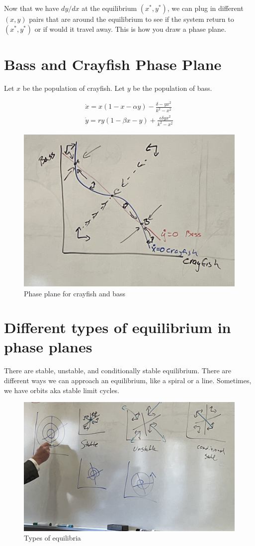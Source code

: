 \documentclass{article}
\begin{document}
Now that we have $dy/dx$ at the equilibrium $(x^*, y^*)$, we can plug in different $(x,y)$ pairs that are around the equilibrium to see if the system return to $(x^*, y^*)$ or if would it travel away. This is how you draw a phase plane. 


\section{Bass and Crayfish Phase Plane}

Let $x$ be the population of crayfish. Let $y$ be the population of bass. 

\begin{align*}
    \dot x = x (1 - x - \alpha y) - \frac{\delta - yx^2}{k^2 - x^2}\\
    \dot y = ry (1 - \beta x - y) + \frac{\epsilon \delta y x^2 }{k ^2 - x^2}
\end{align*}

\begin{figure}[htp]
    \centering
    \includegraphics[width=0.5\linewidth]{Screen Shot 2023-11-15 at 11.36.44 AM.png}
    \caption{Phase plane for crayfish and bass}
    \label{fig:enter-label}
\end{figure}


\section{Different types of equilibrium in phase planes}

There are stable, unstable, and conditionally stable equilibrium. There are different ways we can approach an equilibrium, like a spiral or a line. Sometimes, we have orbits aka stable limit cycles. 

\begin{figure}[htp]
    \centering
    \includegraphics[width=0.5\linewidth]{Screen Shot 2023-11-15 at 11.38.59 AM.png}
    \caption{Types of equilibria}
    \label{fig:enter-label}
\end{figure}
\end{document}
